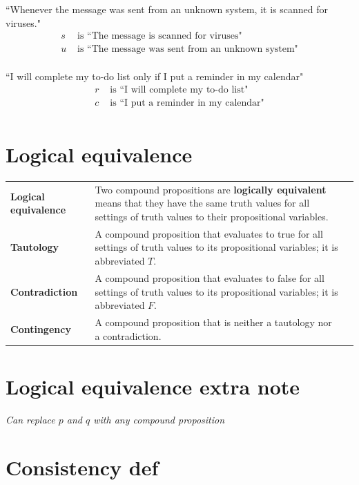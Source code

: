 \documentclass[12pt, oneside]{article}
\begin{document}
\begin{multicols}{2}
``Whenever the message was sent from an unknown system, it is scanned for viruses."
\columnbreak
\begin{align*}
s &\text{ is  ``The message is scanned for viruses"} \\
u &\text{ is  ``The message was sent from an unknown system"} \\
\end{align*}
\end{multicols}
\vfill

\begin{multicols}{2}
``I will complete my to-do list only if I put a reminder in my calendar"
\columnbreak
\begin{align*}
r &\text{ is  ``I will complete my to-do list"} \\
c &\text{ is  ``I put a reminder in my calendar"} \\
\end{align*}
\end{multicols}
\vfill \vfill
\section*{Logical equivalence}


\begin{tabular}{lp{4in}p{2in}}
{\bf Logical equivalence } &Two compound  propositions are {\bf logically  equivalent} means that  they 
have the  same  truth  values for all settings of truth  values to their propositional  variables.\\
{\bf Tautology} & A compound proposition that evaluates to true
for all settings of truth  values to its propositional  variables; it is  abbreviated $T$.\\
{\bf Contradiction} & A compound proposition that  evaluates  to  false 
for  all settings of truth  values to its propositional  variables; it  is abbreviated $F$.\\
{\bf Contingency} & A compound proposition that is neither a tautology nor a contradiction.\\
\end{tabular}
 \vfill
\section*{Logical equivalence extra note}


{\it Can replace $p$ and $q$ with any compound proposition}
 \vfill
\section*{Consistency def}
\end{document}
